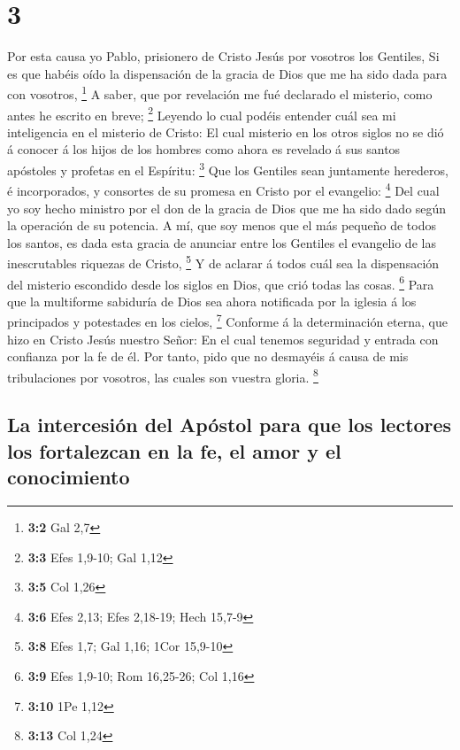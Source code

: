 \hypertarget{section-2}{%
\section{3}\label{section-2}}

 Por esta causa yo Pablo, prisionero de Cristo Jesús por
vosotros los Gentiles,  Si es que habéis oído la
dispensación de la gracia de Dios que me ha sido dada para con vosotros,
\footnote{\textbf{3:2} Gal 2,7}  A saber, que por revelación
me fué declarado el misterio, como antes he escrito en breve;
\footnote{\textbf{3:3} Efes 1,9-10; Gal 1,12}  Leyendo lo
cual podéis entender cuál sea mi inteligencia en el misterio de Cristo:
 El cual misterio en los otros siglos no se dió á conocer á
los hijos de los hombres como ahora es revelado á sus santos apóstoles y
profetas en el Espíritu: \footnote{\textbf{3:5} Col 1,26} 
Que los Gentiles sean juntamente herederos, é incorporados, y consortes
de su promesa en Cristo por el evangelio: \footnote{\textbf{3:6} Efes
  2,13; Efes 2,18-19; Hech 15,7-9}  Del cual yo soy hecho
ministro por el don de la gracia de Dios que me ha sido dado según la
operación de su potencia.  A mí, que soy menos que el más
pequeño de todos los santos, es dada esta gracia de anunciar entre los
Gentiles el evangelio de las inescrutables riquezas de Cristo,
\footnote{\textbf{3:8} Efes 1,7; Gal 1,16; 1Cor 15,9-10}  Y
de aclarar á todos cuál sea la dispensación del misterio escondido desde
los siglos en Dios, que crió todas las cosas. \footnote{\textbf{3:9}
  Efes 1,9-10; Rom 16,25-26; Col 1,16}  Para que la
multiforme sabiduría de Dios sea ahora notificada por la iglesia á los
principados y potestades en los cielos, \footnote{\textbf{3:10} 1Pe 1,12}
 Conforme á la determinación eterna, que hizo en Cristo
Jesús nuestro Señor:  En el cual tenemos seguridad y
entrada con confianza por la fe de él.  Por tanto, pido que
no desmayéis á causa de mis tribulaciones por vosotros, las cuales son
vuestra gloria. \footnote{\textbf{3:13} Col 1,24}

\hypertarget{la-intercesiuxf3n-del-apuxf3stol-para-que-los-lectores-los-fortalezcan-en-la-fe-el-amor-y-el-conocimiento}{%
\subsection{La intercesión del Apóstol para que los lectores los
fortalezcan en la fe, el amor y el
conocimiento}\label{la-intercesiuxf3n-del-apuxf3stol-para-que-los-lectores-los-fortalezcan-en-la-fe-el-amor-y-el-conocimiento}}

